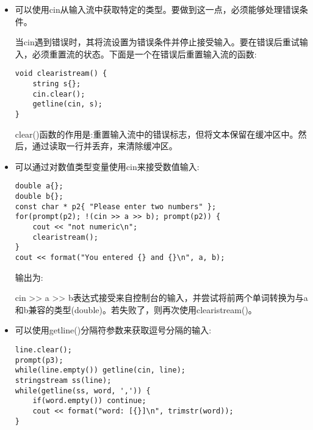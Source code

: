 \begin{itemize}
std::getline()函数有三个参数:

\begin{lstlisting}[style=styleCXX]
getline(basic_istream&& in, string& str, char delim );
\end{lstlisting}

第一个参数是输出流，第二个参数是对字符串对象的引用，第三个参数是行结束分隔符。

若未指定，分隔符默认为换行符'\verb|\|n'字符。

我感觉getline()比cin.getline()方法更方便。

\item 
可以使用cin从输入流中获取特定的类型。要做到这一点，必须能够处理错误条件。

当cin遇到错误时，其将流设置为错误条件并停止接受输入。要在错误后重试输入，必须重置流的状态。下面是一个在错误后重置输入流的函数:

\begin{lstlisting}[style=styleCXX]
void clearistream() {
	string s{};
	cin.clear();
	getline(cin, s);
}
\end{lstlisting}

clear()函数的作用是:重置输入流中的错误标志，但将文本保留在缓冲区中。然后，通过读取一行并丢弃，来清除缓冲区。

\item 
可以通过对数值类型变量使用cin来接受数值输入:

\begin{lstlisting}[style=styleCXX]
double a{};
double b{};
const char * p2{ "Please enter two numbers" };
for(prompt(p2); !(cin >> a >> b); prompt(p2)) {
	cout << "not numeric\n";
	clearistream();
}
cout << format("You entered {} and {}\n", a, b);
\end{lstlisting}

输出为:


cin >{}> a >{}> b表达式接受来自控制台的输入，并尝试将前两个单词转换为与a和b兼容的类型(double)。若失败了，则再次使用clearistream()。

\item 
可以使用getline()分隔符参数来获取逗号分隔的输入:

\begin{lstlisting}[style=styleCXX]
line.clear();
prompt(p3);
while(line.empty()) getline(cin, line);
stringstream ss(line);
while(getline(ss, word, ',')) {
	if(word.empty()) continue;
	cout << format("word: [{}]\n", trimstr(word));
}
\end{lstlisting}


\end{itemize}
